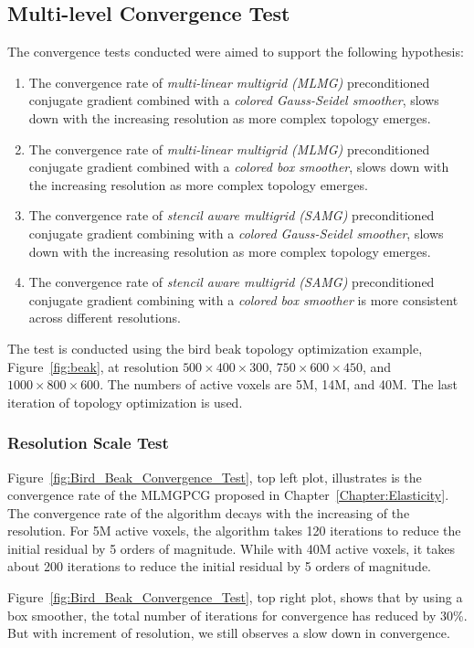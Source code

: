  \subsection{Multi-level Convergence Test}
 The convergence tests conducted were aimed to support the following hypothesis:
 \begin{enumerate}
 \item The convergence rate of \textit{multi-linear multigrid (MLMG)} preconditioned conjugate gradient combined with a \textit{colored Gauss-Seidel smoother}, slows down with the increasing resolution as more complex topology emerges.
  \item The convergence rate of \textit{multi-linear multigrid (MLMG)} preconditioned conjugate gradient combined with a \textit{colored box smoother}, slows down with the increasing resolution as more complex topology emerges.
 \item The convergence rate of \textit{stencil aware multigrid (SAMG)} preconditioned conjugate gradient combining with a  \textit{colored Gauss-Seidel smoother}, slows down with the increasing resolution as more complex topology emerges.
 \item The convergence rate of \textit{stencil aware multigrid (SAMG)} preconditioned conjugate gradient combining with a \textit{colored box smoother} is more consistent across different resolutions.
 \end{enumerate}
  The test is conducted using the bird beak topology optimization example, Figure~\ref{fig:beak}, at resolution $500 \times 400 \times 300$, $750 \times 600 \times 450$, and $1000 \times 800 \times 600$. The numbers of active voxels are 5M, 14M, and 40M. The last iteration of topology optimization is used.
 \subsubsection{Resolution Scale Test}
 Figure~\ref{fig:Bird_Beak_Convergence_Test}, top left plot, illustrates is the convergence rate of the MLMGPCG proposed in Chapter~\ref{Chapter:Elasticity}. The convergence rate of the algorithm decays with the increasing of the resolution. For 5M active voxels, the algorithm takes 120 iterations to reduce the initial residual by 5 orders of magnitude. While with 40M active voxels, it takes about 200 iterations to reduce the initial residual by 5 orders of magnitude.
 
Figure~\ref{fig:Bird_Beak_Convergence_Test}, top right plot, shows that by using a box smoother, the total number of iterations for convergence has reduced by 30\%. But with increment of resolution, we still observes a slow down in convergence.

